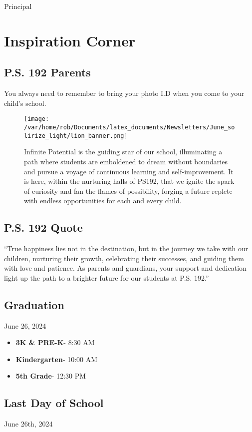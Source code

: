 \documentclass[11pt]{article}
\begin{document}
Principal
\clearpage

\section{Inspiration Corner}
\label{sec:orgbcc62a4}
\subsection{P.S. 192 Parents}
\label{sec:org06381f7}
You always need to remember to bring your photo I.D when you come to your child’s school.

\begin{figure}[htbp]
\centering
\texttt{[image: /var/home/rob/Documents/latex\_documents/Newsletters/June\_solirize\_light/lion\_banner.png]}
\caption{Infinite Potential is the guiding star of our school, illuminating a path where students are emboldened to dream without boundaries and pursue a voyage of continuous learning and self-improvement. It is here, within the nurturing halls of PS192, that we ignite the spark of curiosity and fan the flames of possibility, forging a future replete with endless opportunities for each and every child.}
\end{figure}
\subsection{P.S. 192 Quote}
\label{sec:orgcc4d13d}
``True happiness lies not in the destination, but in the journey we take with our children, nurturing their growth, celebrating their successes, and guiding them with love and patience. As parents and guardians, your support and dedication light up the path to a brighter future for our students at P.S. 192.''
\subsection{Graduation}
\label{sec:org9daed1d}
June 26, 2024
\begin{itemize}
\item \textbf{3K \& PRE-K}- 8:30 AM
\item \textbf{Kindergarten}- 10:00 AM
\item \textbf{5th Grade}- 12:30 PM
\end{itemize}
\subsection{Last Day of School}
\label{sec:orga049984}
June 26th, 2024
\end{document}
